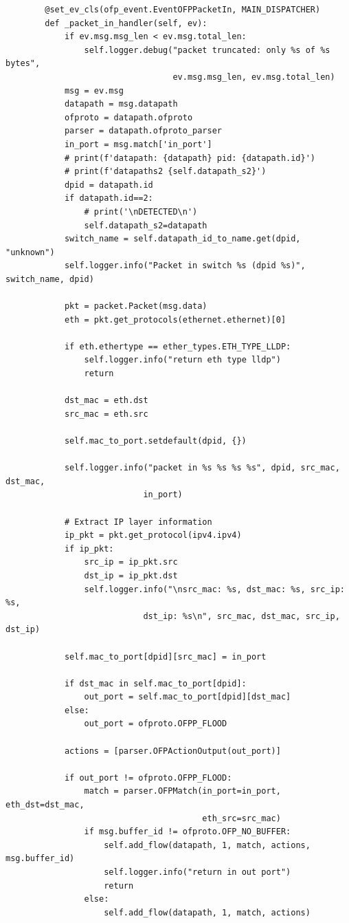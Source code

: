 \documentclass[a4paper,12pt]{article}
\begin{document}
\begin{verbatim}
        @set_ev_cls(ofp_event.EventOFPPacketIn, MAIN_DISPATCHER)
        def _packet_in_handler(self, ev):        
            if ev.msg.msg_len < ev.msg.total_len:
                self.logger.debug("packet truncated: only %s of %s bytes",
                                  ev.msg.msg_len, ev.msg.total_len)
            msg = ev.msg        
            datapath = msg.datapath
            ofproto = datapath.ofproto
            parser = datapath.ofproto_parser
            in_port = msg.match['in_port']
            # print(f'datapath: {datapath} pid: {datapath.id}')
            # print(f'datapaths2 {self.datapath_s2}')
            dpid = datapath.id
            if datapath.id==2:
                # print('\nDETECTED\n')
                self.datapath_s2=datapath
            switch_name = self.datapath_id_to_name.get(dpid, "unknown")
            self.logger.info("Packet in switch %s (dpid %s)", switch_name, dpid)
            
            pkt = packet.Packet(msg.data)
            eth = pkt.get_protocols(ethernet.ethernet)[0]
    
            if eth.ethertype == ether_types.ETH_TYPE_LLDP:
                self.logger.info("return eth type lldp")
                return
    
            dst_mac = eth.dst
            src_mac = eth.src
    
            self.mac_to_port.setdefault(dpid, {})
    
            self.logger.info("packet in %s %s %s %s", dpid, src_mac, dst_mac,
                            in_port)
    
            # Extract IP layer information
            ip_pkt = pkt.get_protocol(ipv4.ipv4)
            if ip_pkt:
                src_ip = ip_pkt.src
                dst_ip = ip_pkt.dst
                self.logger.info("\nsrc_mac: %s, dst_mac: %s, src_ip: %s, 
                            dst_ip: %s\n", src_mac, dst_mac, src_ip, dst_ip)
    
            self.mac_to_port[dpid][src_mac] = in_port
    
            if dst_mac in self.mac_to_port[dpid]:
                out_port = self.mac_to_port[dpid][dst_mac]
            else:
                out_port = ofproto.OFPP_FLOOD
    
            actions = [parser.OFPActionOutput(out_port)]
    
            if out_port != ofproto.OFPP_FLOOD:
                match = parser.OFPMatch(in_port=in_port, eth_dst=dst_mac, 
                                        eth_src=src_mac)
                if msg.buffer_id != ofproto.OFP_NO_BUFFER:
                    self.add_flow(datapath, 1, match, actions, msg.buffer_id)
                    self.logger.info("return in out port")
                    return
                else:
                    self.add_flow(datapath, 1, match, actions)
    

\end{verbatim}
\end{document}
